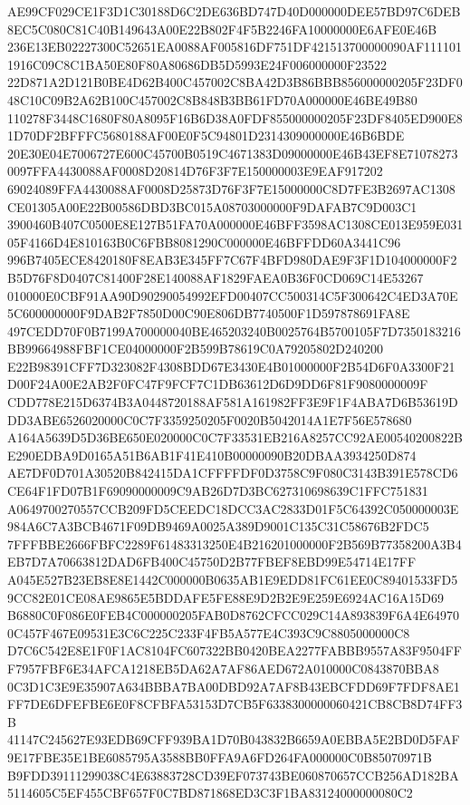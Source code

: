 \documentclass[UTF8,fontset=fandol,zihao=-4,a4paper]{ctexart}
\begin{document}
{{AE99CF029CE1F3D1C30188D6C2DE636BD747D40D000000DEE57BD97C6DEB8EC5C080C81C40B149643A00E22B802F4F5B2246FA10000000E6AFE0E46B
236E13EB02227300C52651EA0088AF005816DF751DF421513700000090AF1111011916C09C8C1BA50E80F80A80686DB5D5993E24F006000000F23522
22D871A2D121B0BE4D62B400C457002C8BA42D3B86BBB856000000205F23DF048C10C09B2A62B100C457002C8B848B3BB61FD70A000000E46BE49B80
110278F3448C1680F80A8095F16B6D38A0FDF855000000205F23DF8405ED900E81D70DF2BFFFC5680188AF00E0F5C94801D2314309000000E46B6BDE
20E30E04E7006727E600C45700B0519C4671383D09000000E46B43EF8E710782730097FFA4430088AF0008D20814D76F3F7E150000003E9EAF917202
69024089FFA4430088AF0008D25873D76F3F7E15000000C8D7FE3B2697AC1308CE01305A00E22B00586DBD3BC015A08703000000F9DAFAB7C9D003C1
3900460B407C0500E8E127B51FA70A000000E46BFF3598AC1308CE013E959E03105F4166D4E810163B0C6FBB8081290C000000E46BFFDD60A3441C96
996B7405ECE8420180F8EAB3E345FF7C67F4BFD980DAE9F3F1D104000000F2B5D76F8D0407C81400F28E140088AF1829FAEA0B36F0CD069C14E53267
010000E0CBF91AA90D90290054992EFD00407CC500314C5F300642C4ED3A70E5C600000000F9DAB2F7850D00C90E806DB7740500F1D597878691FA8E
497CEDD70F0B7199A700000040BE465203240B0025764B5700105F7D7350183216BB99664988FBF1CE04000000F2B599B78619C0A79205802D240200
E22B98391CFF7D323082F4308BDD67E3430E4B01000000F2B54D6F0A3300F21D00F24A00E2AB2F0FC47F9FCF7C1DB63612D6D9DD6F81F9080000009F
CDD778E215D6374B3A0448720188AF581A161982FF3E9F1F4ABA7D6B53619DDD3ABE6526020000C0C7F3359250205F0020B5042014A1E7F56E578680
A164A5639D5D36BE650E020000C0C7F33531EB216A8257CC92AE00540200822BE290EDBA9D0165A51B6AB1F41E410B00000090B20DBAA3934250D874
AE7DF0D701A30520B842415DA1CFFFFDF0D3758C9F080C3143B391E578CD6CE64F1FD07B1F69090000009C9AB26D7D3BC627310698639C1FFC751831
A0649700270557CCB209FD5CEEDC18DCC3AC2833D01F5C64392C050000003E984A6C7A3BCB4671F09DB9469A0025A389D9001C135C31C58676B2FDC5
7FFFBBE2666FBFC2289F61483313250E4B216201000000F2B569B77358200A3B4EB7D7A70663812DAD6FB400C45750D2B77FBEF8EBD99E54714E17FF
A045E527B23EB8E8E1442C000000B0635AB1E9EDD81FC61EE0C89401533FD59CC82E01CE08AE9865E5BDDAFE5FE88E9D2B2E9E259E6924AC16A15D69
B6880C0F086E0FEB4C000000205FAB0D8762CFCC029C14A893839F6A4E649700C457F467E09531E3C6C225C233F4FB5A577E4C393C9C8805000000C8
D7C6C542E8E1F0F1AC8104FC607322BB0420BEA2277FABBB9557A83F9504FFF7957FBF6E34AFCA1218EB5DA62A7AF86AED672A010000C0843870BBA8
0C3D1C3E9E35907A634BBBA7BA00DBD92A7AF8B43EBCFDD69F7FDF8AE1FF7DE6DFEFBE6E0F8CFBFA53153D7CB5F6338300000060421CB8CB8D74FF3B
41147C245627E93EDB69CFF939BA1D70B043832B6659A0EBBA5E2BD0D5FAF9E17FBE35E1BE6085795A3588BB0FFA9A6FD264FA000000C0B85070971B
B9FDD39111299038C4E63883728CD39EF073743BE060870657CCB256AD182BA5114605C5EF455CBF657F0C7BD871868ED3C3F1BA83124000000080C2
}}
\end{document}
